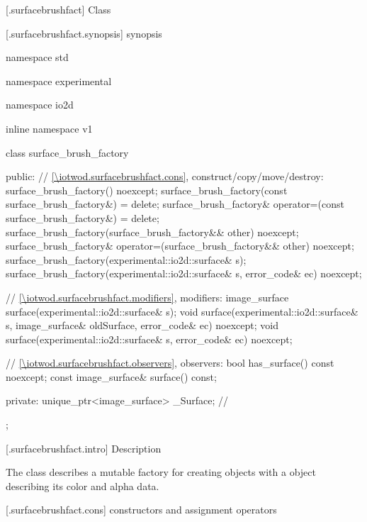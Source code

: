  [\iotwod.surfacebrushfact] {Class }

 [\iotwod.surfacebrushfact.synopsis] { synopsis}

\begin{codeblock}
namespace std { namespace experimental { namespace io2d { inline namespace v1 {
  class surface_brush_factory {
  public:
    // \ref{\iotwod.surfacebrushfact.cons}, construct/copy/move/destroy:
    surface_brush_factory() noexcept;
    surface_brush_factory(const surface_brush_factory&) = delete;
    surface_brush_factory& operator=(const surface_brush_factory&) = delete;
    surface_brush_factory(surface_brush_factory&& other) noexcept;
    surface_brush_factory& operator=(surface_brush_factory&& other) noexcept;
    surface_brush_factory(experimental::io2d::surface& s);
    surface_brush_factory(experimental::io2d::surface& s, error_code& ec) noexcept;
    
    // \ref{\iotwod.surfacebrushfact.modifiers}, modifiers:
    image_surface surface(experimental::io2d::surface& s);
    void surface(experimental::io2d::surface& s, image_surface& oldSurface, error_code& ec) noexcept;
    void surface(experimental::io2d::surface& s, error_code& ec) noexcept;
    
    // \ref{\iotwod.surfacebrushfact.observers}, observers:
    bool has_surface() const noexcept;
    const image_surface& surface() const;
    
  private:
    unique_ptr<image_surface> _Surface; // \expos
  };
} } } }
\end{codeblock}

 [\iotwod.surfacebrushfact.intro] { Description}

\pnum
{}
The class  describes a mutable factory for creating  objects with a  object describing its color and alpha data.

 [\iotwod.surfacebrushfact.cons] { constructors and assignment operators}

